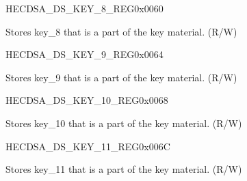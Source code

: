 \begin{register}{H}{ECDSA\_DS\_KEY\_8\_REG}{0x0060}\label{regdesc:ECDSADSKEY8REG}
%
\regnewline%
\begin{regdesc}\begin{reglist}
\label{fielddesc:ECDSADSKEY8}\item [ECDSA\_DS\_KEY\_8] Stores key\_8 that is a part of the key material. (R/W)
\end{reglist}\end{regdesc}
\end{register}


\begin{register}{H}{ECDSA\_DS\_KEY\_9\_REG}{0x0064}\label{regdesc:ECDSADSKEY9REG}
%
\regnewline%
\begin{regdesc}\begin{reglist}
\label{fielddesc:ECDSADSKEY9}\item [ECDSA\_DS\_KEY\_9] Stores key\_9 that is a part of the key material. (R/W)
\end{reglist}\end{regdesc}
\end{register}


\begin{register}{H}{ECDSA\_DS\_KEY\_10\_REG}{0x0068}\label{regdesc:ECDSADSKEY10REG}
%
\regnewline%
\begin{regdesc}\begin{reglist}
\label{fielddesc:ECDSADSKEY10}\item [ECDSA\_DS\_KEY\_10] Stores key\_10 that is a part of the key material. (R/W)
\end{reglist}\end{regdesc}
\end{register}


\begin{register}{H}{ECDSA\_DS\_KEY\_11\_REG}{0x006C}\label{regdesc:ECDSADSKEY11REG}
%
\regnewline%
\begin{regdesc}\begin{reglist}
\label{fielddesc:ECDSADSKEY11}\item [ECDSA\_DS\_KEY\_11] Stores key\_11 that is a part of the key material. (R/W)
\end{reglist}\end{regdesc}
\end{register}


